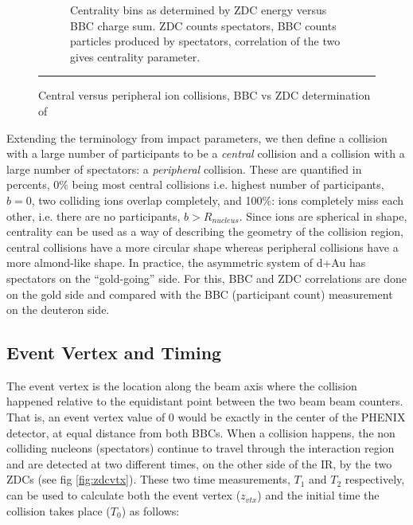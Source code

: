 \begin{figure}[htbp!]
\begin{subfigure}[p]{1\textwidth}
  \caption[Centrality bins as determined by ZDC energy versus BBC charge sum]{Centrality bins as determined by ZDC energy versus BBC charge sum\citep{Ghosh2001}. ZDC counts spectators, BBC counts particles produced by spectators, correlation of the two gives centrality parameter.}
  \label{fig:zdcvsbbc}
\end{subfigure}

    \rule{35em}{0.5pt}
  \caption[Central versus peripheral ion collisions, BBC vs ZDC determination of]{Central versus peripheral ion collisions, BBC vs ZDC determination of}
  \label{fig:centralvsperipheral}
\end{figure}


Extending the terminology from impact parameters, we then define a collision with a large number of participants to be a \textit{central} collision and a collision with a large number of spectators: a \textit{peripheral} collision. These are quantified in percents, 0$\%$ being most central collisions i.e. highest number of participants, $b=0$, two colliding ions overlap completely, and 100$\%$: ions completely miss each other, i.e. there are no participants, $b > R_{nucleus}$. Since ions are spherical in shape, centrality can be used as a way of describing the geometry of the collision region, central collisions have a more circular shape whereas peripheral collisions have a more almond-like shape. In practice, the asymmetric system of d+Au has spectators on the ``gold-going'' side. For this, BBC and ZDC correlations are done on the gold side and compared with the BBC (participant count) measurement on the deuteron side.



\subsection{Event Vertex and Timing}
\label{sect:timeandvtx}
The event vertex is the location along the beam axis where the collision happened relative to the equidistant point between the two beam beam counters. That is, an event vertex value of 0 would be exactly in the center of the PHENIX detector, at equal distance from both BBCs. When a collision happens, the non colliding nucleons (spectators) continue to travel through the interaction region and are detected at two different times, on the other side of the IR, by the two ZDCs (see fig \ref{fig:zdcvtx}). These two time measurements, $T_1$ and $T_2$ respectively, can be used to calculate both the event vertex ($z_{vtx}$) and the initial time the collision takes place ($T_0$) as follows\citep{Mitchell:2002wu}:

